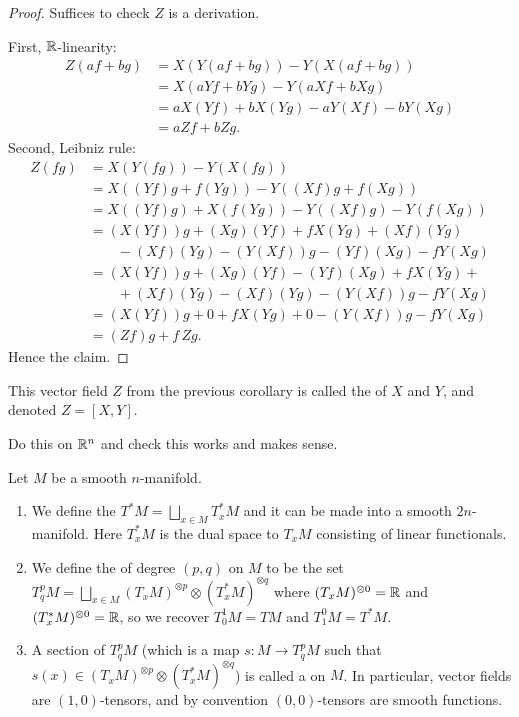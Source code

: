 \begin{proof}
Suffices to check $Z$ is a derivation.

First, $\mathbb{R}$-linearity:
\begin{subequations}
  \begin{align}
Z(af+bg) &= X(Y(af+bg))-Y(X(af+bg))\\
&= X(aYf+bYg)-Y(aXf+bXg)\\
&= aX(Yf)+bX(Yg)-aY(Xf)-bY(Xg)\\
&= aZf + bZg.
  \end{align}
\end{subequations}
Second, Leibniz rule:
\begin{subequations}
  \begin{align}
Z(fg) &= X(Y(fg))-Y(X(fg))\\
&=X((Yf)g+f(Yg))-Y((Xf)g+f(Xg))\\
&=X((Yf)g)+X(f(Yg))-Y((Xf)g)-Y(f(Xg))\\
&=(X(Yf))g+(Xg)(Yf)+fX(Yg)+(Xf)(Yg)\nonumber\\
&\qquad-(Xf)(Yg)-(Y(Xf))g-(Yf)(Xg)-fY(Xg)\\
&=(X(Yf))g+(Xg)(Yf)-(Yf)(Xg)+fX(Yg)+\nonumber\\
&\qquad+(Xf)(Yg)-(Xf)(Yg)-(Y(Xf))g-fY(Xg)\\
&=(X(Yf))g+0+fX(Yg)+0-(Y(Xf))g-fY(Xg)\\
&=(Zf)g+f\,Zg.
  \end{align}
\end{subequations}
Hence the claim.
\end{proof}

\begin{definition}
This vector field $Z$ from the previous corollary is called the
 of $X$ and $Y$, and denoted $Z=[X,Y]$.
\end{definition}

\begin{xca}
Do this on $\mathbb{R}^{n}$ and check this works and makes sense.
\end{xca}

\begin{definition}
Let $M$ be a smooth $n$-manifold.
\begin{enumerate}
\item We define the  $T^{*}M=\bigsqcup_{x\in M}T^{*}_{x}M$
  and it can be made into a smooth $2n$-manifold. Here $T^{*}_{x}M$ is
  the dual space to $T_{x}M$ consisting of linear functionals.
\item We define the  of degree $(p,q)$ on $M$ to
  be the set $T^{p}_{q}M=\bigsqcup_{x\in M}(T_{x}M)^{\otimes p}\otimes(T^{*}_{x}M)^{\otimes q}$
  where $(T_{x}M)^{\otimes0}=\mathbb{R}$ and $(T^{*}_{x}M)^{\otimes 0}=\mathbb{R}$,
  so we recover $T^{1}_{0}M=TM$ and $T^{0}_{1}M=T^{*}M$. 
\item A section of $T^{p}_{q}M$ (which is a map $s\colon M\to T^{p}_{q}M$
  such that $s(x)\in (T_{x}M)^{\otimes p}\otimes(T^{*}_{x}M)^{\otimes q}$)
  is called a  on $M$. In particular, vector
  fields are $(1,0)$-tensors, and by convention $(0,0)$-tensors are
  smooth functions.
\end{enumerate}
\end{definition}